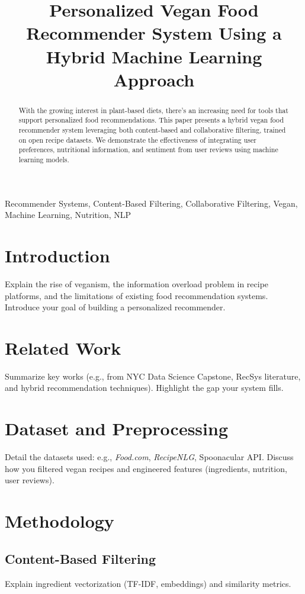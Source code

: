 \documentclass[conference]{IEEEtran}
\title{Personalized Vegan Food Recommender System Using a Hybrid Machine Learning Approach}
\author{
\IEEEauthorblockN{Zuriel Aviles}
\IEEEauthorblockA{
\textit{B.S. Computer Science, Cognitive Science} \\
\textit{Rensselaer Polytechnic Institute}\\
Troy, New York \\
avilez@rpi.edu}
}
\begin{document}
\maketitle

\begin{abstract}
With the growing interest in plant-based diets, there's an increasing need for tools that support personalized food recommendations. This paper presents a hybrid vegan food recommender system leveraging both content-based and collaborative filtering, trained on open recipe datasets. We demonstrate the effectiveness of integrating user preferences, nutritional information, and sentiment from user reviews using machine learning models.
\end{abstract}

\begin{IEEEkeywords}
Recommender Systems, Content-Based Filtering, Collaborative Filtering, Vegan, Machine Learning, Nutrition, NLP
\end{IEEEkeywords}

\section{Introduction}
Explain the rise of veganism, the information overload problem in recipe platforms, and the limitations of existing food recommendation systems. Introduce your goal of building a personalized recommender.

\section{Related Work}
Summarize key works (e.g., from NYC Data Science Capstone, RecSys literature, and hybrid recommendation techniques). Highlight the gap your system fills.

\section{Dataset and Preprocessing}
Detail the datasets used: e.g., \textit{Food.com}, \textit{RecipeNLG}, Spoonacular API. Discuss how you filtered vegan recipes and engineered features (ingredients, nutrition, user reviews).

\section{Methodology}
\subsection{Content-Based Filtering}
Explain ingredient vectorization (TF-IDF, embeddings) and similarity metrics.
\end{document}
